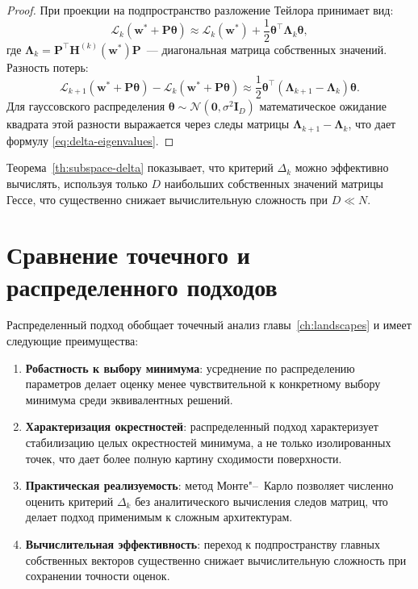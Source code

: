 \begin{proof}
При проекции на подпространство разложение Тейлора принимает вид:
\[
\mathcal{L}_k(\mathbf{w}^* + \mathbf{P}\boldsymbol{\theta}) \approx \mathcal{L}_k(\mathbf{w}^*) + \frac{1}{2}\boldsymbol{\theta}^\top \boldsymbol{\Lambda}_k \boldsymbol{\theta},
\]
где $\boldsymbol{\Lambda}_k = \mathbf{P}^\top \mathbf{H}^{(k)}(\mathbf{w}^*) \mathbf{P}$~--- диагональная матрица собственных значений. Разность потерь:
\[
\mathcal{L}_{k+1}(\mathbf{w}^* + \mathbf{P}\boldsymbol{\theta}) - \mathcal{L}_k(\mathbf{w}^* + \mathbf{P}\boldsymbol{\theta}) \approx \frac{1}{2}\boldsymbol{\theta}^\top (\boldsymbol{\Lambda}_{k+1} - \boldsymbol{\Lambda}_k) \boldsymbol{\theta}.
\]
Для гауссовского распределения $\boldsymbol{\theta} \sim \mathcal{N}(\mathbf{0}, \sigma^2 \mathbf{I}_D)$ математическое ожидание квадрата этой разности выражается через следы матрицы $\boldsymbol{\Lambda}_{k+1} - \boldsymbol{\Lambda}_k$, что дает формулу \eqref{eq:delta-eigenvalues}.
\end{proof}

Теорема~\ref{th:subspace-delta} показывает, что критерий $\Delta_k$ можно эффективно вычислять, используя только $D$ наибольших собственных значений матрицы Гессе, что существенно снижает вычислительную сложность при $D \ll N$.

\section{Сравнение точечного и распределенного подходов}

Распределенный подход обобщает точечный анализ главы~\ref{ch:landscapes} и имеет следующие преимущества:

\begin{enumerate}
\item \textbf{Робастность к выбору минимума}: усреднение по распределению параметров делает оценку менее чувствительной к конкретному выбору минимума среди эквивалентных решений.

\item \textbf{Характеризация окрестностей}: распределенный подход характеризует стабилизацию целых окрестностей минимума, а не только изолированных точек, что дает более полную картину сходимости поверхности.

\item \textbf{Практическая реализуемость}: метод Монте"--~Карло позволяет численно оценить критерий $\Delta_k$ без аналитического вычисления следов матриц, что делает подход применимым к сложным архитектурам.

\item \textbf{Вычислительная эффективность}: переход к подпространству главных собственных векторов существенно снижает вычислительную сложность при сохранении точности оценок.
\end{enumerate}

